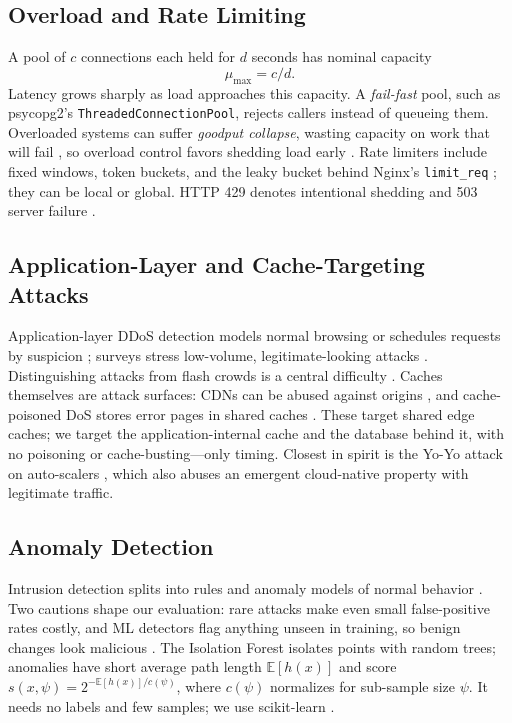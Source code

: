 \documentclass[journal]{IEEEtran}
\begin{document}
\subsection{Overload and Rate Limiting}
A pool of $c$ connections each held for $d$ seconds has nominal capacity
\begin{equation}
\mu_{\max} = c/d .
\label{eq:capacity}
\end{equation}
Latency grows sharply as load approaches this capacity. A \emph{fail-fast} pool, such as psycopg2's
\texttt{ThreadedConnectionPool}, rejects callers instead of queueing
them. Overloaded systems can suffer \emph{goodput collapse}, wasting capacity on work
that will fail \cite{mogul1997}, so overload control favors shedding load
early \cite{welsh2001}. Rate limiters include fixed
windows, token buckets, and the leaky bucket behind Nginx's \texttt{limit\_req}
\cite{nginxlimitreq}; they can be local or global.
HTTP 429 denotes intentional shedding and 503 server failure \cite{rfc6585}.

\subsection{Application-Layer and Cache-Targeting Attacks}
Application-layer DDoS detection models normal browsing \cite{xie2009} or schedules
requests by suspicion \cite{ranjan2009}; surveys stress low-volume, legitimate-looking
attacks \cite{praseed2019}. Distinguishing attacks from flash crowds is a central
difficulty \cite{jung2002,kandula2005}. Caches themselves are attack surfaces: CDNs
can be abused against origins \cite{guo2020}, and cache-poisoned DoS
stores error pages in shared caches \cite{nguyen2019}. These target shared edge caches;
we target the application-internal cache and the database behind it, with no poisoning
or cache-busting---only timing. Closest in spirit is the Yo-Yo attack on auto-scalers
\cite{sides2016,bremlerbarr2017}, which also abuses an emergent cloud-native property
with legitimate traffic.

\subsection{Anomaly Detection}
Intrusion detection splits into rules and anomaly models of normal behavior
\cite{chandola2009}. Two cautions shape our evaluation: rare
attacks make even small false-positive rates costly, and
ML detectors flag anything unseen in training, so benign changes look malicious
\cite{sommer2010}. The Isolation Forest \cite{liu2008,liu2012} isolates points with
random trees; anomalies have short average path length $\mathbb{E}[h(x)]$ and score
$s(x,\psi)=2^{-\mathbb{E}[h(x)]/c(\psi)}$, where $c(\psi)$ normalizes for sub-sample
size $\psi$. It needs no labels and few samples; we use scikit-learn
\cite{pedregosa2011}.
\end{document}
